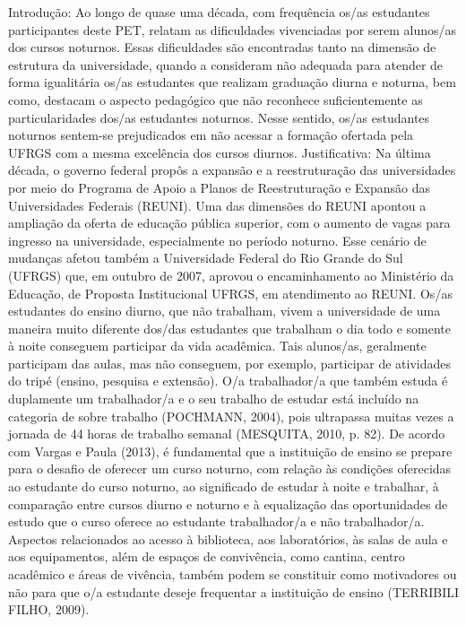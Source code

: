 Introdução:
Ao longo de quase uma década, com frequência os/as estudantes participantes deste PET, relatam as
dificuldades vivenciadas por serem alunos/as dos cursos noturnos. Essas dificuldades são encontradas tanto na
dimensão de estrutura da universidade, quando a consideram não adequada para atender de forma igualitária os/as
estudantes que realizam graduação diurna e noturna, bem como, destacam o aspecto pedagógico que não reconhece
suficientemente as particularidades dos/as estudantes noturnos. Nesse sentido, os/as estudantes noturnos sentem-se
prejudicados em não acessar a formação ofertada pela UFRGS com a mesma excelência dos cursos diurnos.
Justificativa:
Na última década, o governo federal propôs a expansão e a reestruturação das universidades por meio do
Programa de Apoio a Planos de Reestruturação e Expansão das Universidades Federais (REUNI). Uma das
dimensões do REUNI apontou a ampliação da oferta de educação pública superior, com o aumento de vagas para
ingresso na universidade, especialmente no período noturno. Esse cenário de mudanças afetou também a
Universidade Federal do Rio Grande do Sul (UFRGS) que, em outubro de 2007, aprovou o encaminhamento ao
Ministério da Educação, de Proposta Institucional UFRGS, em atendimento ao REUNI.
Os/as estudantes do ensino diurno, que não trabalham, vivem a universidade de uma maneira muito
diferente dos/das estudantes que trabalham o dia todo e somente à noite conseguem participar da vida acadêmica.
Tais alunos/as, geralmente participam das aulas, mas não conseguem, por exemplo, participar de atividades do tripé
(ensino, pesquisa e extensão). O/a trabalhador/a que também estuda é duplamente um trabalhador/a e o seu trabalho
de estudar está incluído na categoria de sobre trabalho (POCHMANN, 2004), pois ultrapassa muitas vezes a jornada
de 44 horas de trabalho semanal (MESQUITA, 2010, p. 82).
De acordo com Vargas e Paula (2013), é fundamental que a instituição de ensino se prepare para o desafio
de oferecer um curso noturno, com relação às condições oferecidas ao estudante do curso noturno, ao significado de
estudar à noite e trabalhar, à comparação entre cursos diurno e noturno e à equalização das oportunidades de estudo
que o curso oferece ao estudante trabalhador/a e não trabalhador/a. Aspectos relacionados ao acesso à biblioteca, aos
laboratórios, às salas de aula e aos equipamentos, além de espaços de convivência, como cantina, centro acadêmico
e áreas de vivência, também podem se constituir como motivadores ou não para que o/a estudante deseje frequentar
a instituição de ensino (TERRIBILI FILHO, 2009).
